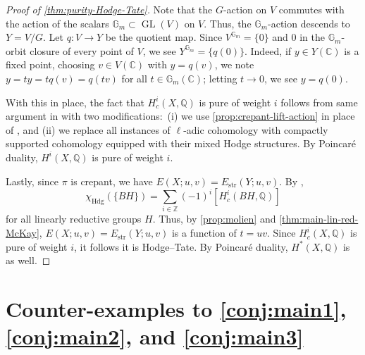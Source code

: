 \documentclass[12pt,a4paper]{amsart}
\theoremstyle{definition}
\newcommand{\ZZ}{\mathbb{Z}}
\newcommand{\QQ}{\mathbb{Q}}
\newcommand{\CC}{\mathbb{C}}
\newcommand{\bG}{\mathbb{G}}
\newcommand{\str}{\mathrm{str}}
\renewcommand{\1}{\textbf{1}}
\newcommand{\<}{\langle}
\renewcommand{\>}{\rangle}
\DeclareMathOperator{\GL}{GL}
\DeclareMathOperator{\Hdg}{Hdg}
\begin{document}
\begin{proof}[{Proof of \autoref{thm:purity-Hodge-Tate}}]
Note that the $G$-action on $V$ commutes with the action of the scalars $\bG_m\subset\GL(V)$ on $V$. Thus, the $\bG_m$-action descends to $Y=V/G$. Let $q\colon V\to Y$ be the quotient map. Since $V^{\bG_m}=\{0\}$ and $0$ in the $\bG_m$-orbit closure of every point of $V$, we see $Y^{\bG_m}=\{q(0)\}$. Indeed, if $y\in Y(\CC)$ is a fixed point, choosing $v\in V(\CC)$ with $y=q(v)$, we note $y=ty=tq(v)=q(tv)$ for all $t\in\bG_m(\CC)$; letting $t\to0$, we see $y=q(0)$.

With this in place, the fact that $H^i_c(X,\QQ)$ is pure of weight $i$ follows from same argument in \cite[Theorem 14.1]{SatrianoUsatine9} with two modifications:~(i) we use \autoref{prop:crepant-lift-action} in place of \cite[Proposition 14.5]{SatrianoUsatine9}, and (ii) we replace all instances of $\ell$-adic cohomology with compactly supported cohomology equipped with their mixed Hodge structures. By Poincar\'e duality, $H^i(X,\QQ)$ is pure of weight $i$.

Lastly, since $\pi$ is crepant, we have $E(X;u,v)=E_{\str}(Y;u,v)$. By \cite[Corollary 7.2]{HuangSatrianoUsatine}, 
\[
	\chi_{\Hdg}(\{BH\})=\sum_{i\in\ZZ}(-1)^i[H_c^i(BH,\QQ)]
\]
for all linearly reductive groups $H$. Thus, by \autoref{prop:molien} and \autoref{thm:main-lin-red-McKay}, $E(X;u,v)=E_{\str}(Y;u,v)$ is a function of $t=uv$. Since $H^i_c(X,\QQ)$ is pure of weight $i$, it follows it is Hodge--Tate. By Poincar\'e duality, $H^*(X,\QQ)$ is as well.
\end{proof}




	
	
	
	
	
	
	
	
	
	
	
	
	
	
	
	


\section{Counter-examples to \autoref{conj:main1}, \autoref{conj:main2}, and \autoref{conj:main3}}
\end{document}
